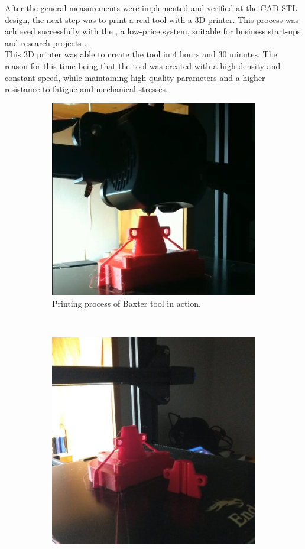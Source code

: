 \documentclass[11pt]{report} %
\begin{document}
After the general measurements were implemented and verified at the CAD STL design, the next step was to print a real tool with a 3D printer. This process was achieved successfully with the , a low-price system, suitable for business start-ups and research projects \citep{cite_3d_printer_for_tool}.\\

This 3D printer was able to create the tool in 4 hours and 30 minutes. The reason for this time being that the tool was created with a high-density and constant speed, while maintaining high quality parameters and a higher resistance to fatigue and mechanical stresses.\\

\begin{figure}[H]
	\centering
	\begin{subfigure}{.5\textwidth}
		\centering
		\includegraphics[width=0.87\linewidth]{assets/imgs/baxter_robot/baxter_spoon_process_printing.png}
		\caption{Printing process of Baxter tool in action.}
		\label{fig_3d_prniter_in_action_1}
	\end{subfigure}~
	\begin{subfigure}{.5\textwidth}
		\centering
		\includegraphics[width=0.8\linewidth]{assets/imgs/baxter_robot/baxter_spoon_process_end.jpeg}

\end{subfigure}
\end{figure}
\end{document}
